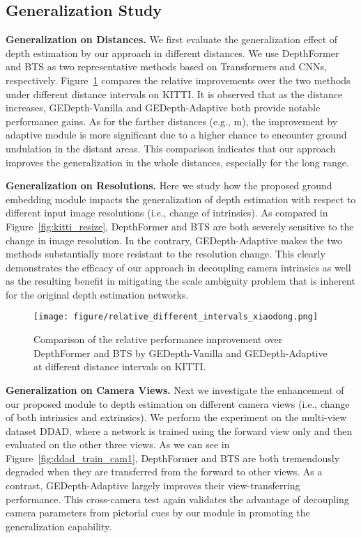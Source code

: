 \documentclass[10pt,twocolumn,letterpaper]{article}
\begin{document}
\subsection{Generalization Study} 
\label{section:generalization}
\noindent\textbf{Generalization on Distances.} 
We first evaluate the generalization effect of depth estimation by our approach in different distances. We use DepthFormer and BTS as two representative methods based on Transformers and CNNs, respectively. Figure~\ref{fig:kitti_distance} compares the relative improvements over the two methods under different distance intervals on KITTI. It is observed that as the distance increases, GEDepth-Vanilla and GEDepth-Adaptive both provide notable performance gains. As for the farther distances (e.g., m), the improvement by adaptive module is more significant due to a higher chance to encounter ground undulation in the distant areas. This comparison indicates that our approach improves the generalization in the whole distances, especially for the long range.               

\noindent\textbf{Generalization on Resolutions.} 
Here we study how the proposed ground embedding module impacts the generalization of depth estimation with respect to different input image resolutions (i.e., change of intrinsics). As compared in Figure~\ref{fig:kitti_resize}, DepthFormer and BTS are both severely sensitive to the change in image resolution. In the contrary, GEDepth-Adaptive makes the two methods substantially more resistant to the resolution change. This clearly demonstrates the efficacy of our approach in decoupling camera intrinsics as well as the resulting benefit in mitigating the scale ambiguity problem that is inherent for the original depth estimation networks. 

\begin{figure}[t]
		\centering
            \texttt{[image: figure/relative\_different\_intervals\_xiaodong.png]}
\caption{
Comparison of the relative performance improvement over DepthFormer and BTS by GEDepth-Vanilla and GEDepth-Adaptive at different distance intervals on KITTI.
}
\label{fig:kitti_distance}
\end{figure}

\noindent\textbf{Generalization on Camera Views.} 
Next we investigate the enhancement of our proposed module to depth estimation on different camera views (i.e., change of both intrinsics and extrinsics). We perform the experiment on the multi-view dataset DDAD, where a network is trained using the forward view only and then evaluated on the other three views. As we can see in Figure~\ref{fig:ddad_train_cam1}, DepthFormer and BTS are both tremendously degraded when they are transferred from the forward to other views. As a contrast, GEDepth-Adaptive largely improves their view-transferring performance. This cross-camera test again validates the advantage of decoupling camera parameters from pictorial cues by our module in promoting the generalization capability.     
\end{document}
